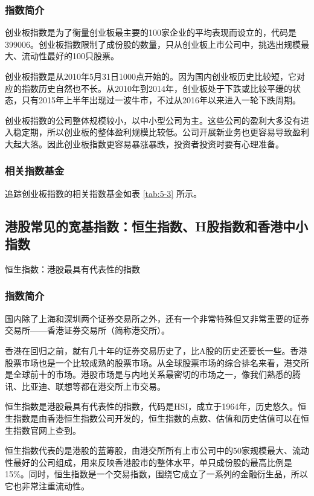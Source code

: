 \subsubsection{指数简介}

创业板指数是为了衡量创业板最主要的100家企业的平均表现而设立的，代码是399006。创业板指数限制了成份股的数量，只从创业板上市公司中，挑选出规模最大、流动性最好的100只股票。

创业板指数是从2010年5月31日1000点开始的。因为国内创业板历史比较短，它对应的指数历史自然也不长。从2010年到2014年，创业板处于下跌或比较平缓的状态，只有2015年上半年出现过一波牛市，不过从2016年以来进入一轮下跌周期。

创业板指数的公司整体规模较小，以中小型公司为主。这些公司的盈利大多没有进入稳定期，所以创业板的整体盈利规模比较低。公司开展新业务也更容易导致盈利大起大落。因此创业板指数更容易暴涨暴跌，投资者投资时要有心理准备。

\subsubsection{相关指数基金}

追踪创业板指数的相关指数基金如表 \ref{tab:5-3} 所示。




\subsection{港股常见的宽基指数：恒生指数、H股指数和香港中小指数}
{\fangsong 恒生指数：港股最具有代表性的指数}

\subsubsection{指数简介}

国内除了上海和深圳两个证券交易所之外，还有一个非常特殊但又非常重要的证券交易所——香港证券交易所（简称港交所）。

香港在回归之前，就有几十年的证券交易历史了，比A股的历史还要长一些。香港股票市场也是一个比较成熟的股票市场。从全球股票市场的综合排名来看，港交所是全球前十的市场。港股市场是与内地关系最密切的市场之一，像我们熟悉的腾讯、比亚迪、联想等都在港交所上市交易。

恒生指数是港股最具有代表性的指数，代码是HSI，成立于1964年，历史悠久。恒生指数是由香港恒生指数公司开发的，恒生指数的点数、估值和历史估值可以在恒生指数官网上查到。

恒生指数代表的是港股的蓝筹股，由港交所所有上市公司中的50家规模最大、流动性最好的公司组成，用来反映香港股市的整体水平，单只成份股的最高比例是15\%。同时，恒生指数是一个交易指数，围绕它成立了一系列的金融衍生品，所以它也非常注重流动性。


